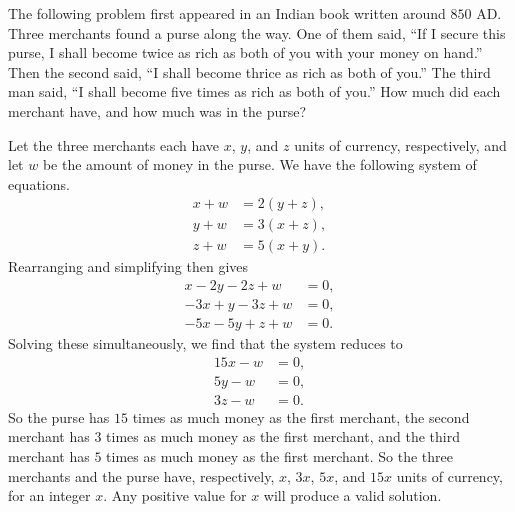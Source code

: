  The following problem first appeared in an Indian book
written around $850$ AD. Three merchants found a purse along the
way. One of them said, ``If I secure this purse, I shall become twice
as rich as both of you with your money on hand.'' Then the second
said, ``I shall become thrice as rich as both of you.'' The third man
said, ``I shall become five times as rich as both of you.'' How much
did each merchant have, and how much was in the purse?
\begin{solution}
  Let the three merchants each have $x$, $y$, and $z$ units of
  currency, respectively, and let $w$ be the amount of money in the
  purse. We have the following system of equations.
  \begin{align*}
    x + w &= 2(y + z), \\
    y + w &= 3(x + z), \\
    z + w &= 5(x + y).
  \end{align*}
  Rearranging and simplifying then gives
  \begin{align*}
    x - 2y - 2z + w &= 0, \\
    -3x + y - 3z + w &= 0, \\
    -5x -5y + z + w &= 0.
  \end{align*}
  Solving these simultaneously, we find that the system reduces to
  \begin{align*}
    15x - w &= 0, \\
    5y - w &= 0, \\
    3z - w &= 0.
  \end{align*}
  So the purse has $15$ times as much money as the first merchant, the
  second merchant has $3$ times as much money as the first merchant,
  and the third merchant has $5$ times as much money as the first
  merchant. So the three merchants and the purse have, respectively,
  $x$, $3x$, $5x$, and $15x$ units of currency, for an integer
  $x$. Any positive value for $x$ will produce a valid solution.
\end{solution}
